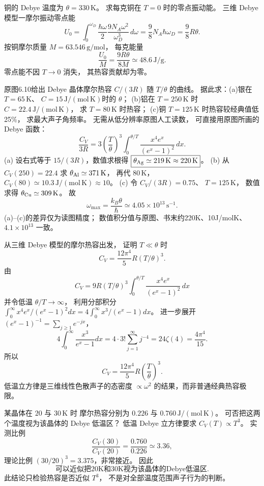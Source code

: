 铜的 Debye 温度为 $\theta=330\,\mathrm K$。
求每克铜在 $T=0$ 时的零点振动能。
\exsolution
三维 Debye 模型一摩尔振动零点能
\[
 U_0=\int_0^{\omega_D}
 \frac{\hbar\omega}2
 \frac{9N_A\omega^2}{\omega_D^3}\,d\omega
 =\frac98N_A\hbar\omega_D
 =\frac98R\theta.
\]
按铜摩尔质量 $M=63.546\,\mathrm{g/mol}$，
每克能量
\[
 \boxed{\frac{U_0}{M}=
 \frac{9R\theta}{8M}
 \simeq48.6\,\mathrm{J/g}}.
\]
\excheck 零点能不因 $T\to0$ 消失，
其热容贡献却为零。

原图6.10给出 Debye 晶体摩尔热容
$C/(3R)$ 随 $T/\theta$ 的曲线。
据此求：(a)银在 $T=65\,\mathrm K$、
$C=15\,\mathrm{J/(mol\,K)}$时的 $\theta$；
(b)铝在 $T=250\,\mathrm K$ 时
$C=22.4\,\mathrm{J/(mol\,K)}$，
求 $T=80\,\mathrm K$ 时热容；
(c)铜 $T=125\,\mathrm K$ 时热容较经典值低25\%，
求最大声子角频率。
\exsolution
无需从低分辨率原图人工读数，
可直接用原图所画的 Debye 函数：
\[
 \frac{C_V}{3R}=
 3\left(\frac{T}{\theta}\right)^3
 \int_0^{\theta/T}\frac{x^4e^x}{(e^x-1)^2}\,dx.
\]
(a) 设右式等于 $15/(3R)$，数值求根得
$\boxed{\theta_{\rm Ag}\simeq219\,\mathrm K\approx220\,\mathrm K}$。
(b) 从 $C_V(250)=22.4$ 求
$\theta_{\rm Al}\simeq371\,\mathrm K$，
再代 $80\,\mathrm K$，
$\boxed{C_V(80)\simeq10.3\,\mathrm{J/(mol\,K)}\approx10}$。
(c) 令 $C_V/(3R)=0.75$、
$T=125\,\mathrm K$，
数值求得 $\theta_{\rm Cu}\simeq309\,\mathrm K$。
故
\[
 \boxed{\omega_{\max}=\frac{k_B\theta}{\hbar}
 \simeq4.05\times10^{13}\,\mathrm{s^{-1}}}.
\]
\excheck (a)--(c)的差异仅为读图精度；
数值积分值与原图、书末约220K、10J/molK、$4.1\times10^{13}$
一致。

从三维 Debye 模型的摩尔热容出发，
证明 $T\ll\theta$ 时
\[
 C_V=\frac{12\pi^4}{5}R(T/\theta)^3.
\]
\exsolution
由
\[
 C_V=9R(T/\theta)^3
 \int_0^{\theta/T}\frac{x^4e^x}{(e^x-1)^2}\,dx
\]
并令低温 $\theta/T\to\infty$，
利用分部积分
$\int_0^\infty x^4e^x/(e^x-1)^2dx
=4\int_0^\infty x^3/(e^x-1)dx$。
进一步展开
$(e^x-1)^{-1}=\sum_{j\ge1}e^{-jx}$，
\[
 4\int_0^\infty\frac{x^3}{e^x-1}dx
 =4\cdot3!\sum_{j=1}^\infty j^{-4}
 =24\zeta(4)=\frac{4\pi^4}{15}.
\]
所以
\[
 \boxed{C_V=\frac{12\pi^4}{5}
 R\left(\frac{T}{\theta}\right)^3}.
\]
\excheck 低温立方律是三维线性色散声子的态密度
$\propto\omega^2$ 的结果，而非普通经典热容极限。

某晶体在 $20$ 与 $30\,\mathrm K$ 时
摩尔热容分别为 $0.226$ 与
$0.760\,\mathrm{J/(mol\,K)}$。
可否把这两个温度视为该晶体的 Debye 低温区？
\exsolution
低温 Debye 立方律要求
$C_V(T)\propto T^3$。
实测比例
\[
 \frac{C_V(30)}{C_V(20)}
 =\frac{0.760}{0.226}\simeq3.36,
\]
理论比例
$(30/20)^3=3.375$，非常接近。
因此
\[
 \boxed{\text{可以近似把20K和30K视为该晶体的Debye低温区}}.
\]
\excheck 此结论只检验热容是否近似 $T^3$，
不是对全部温度范围声子行为的判断。

